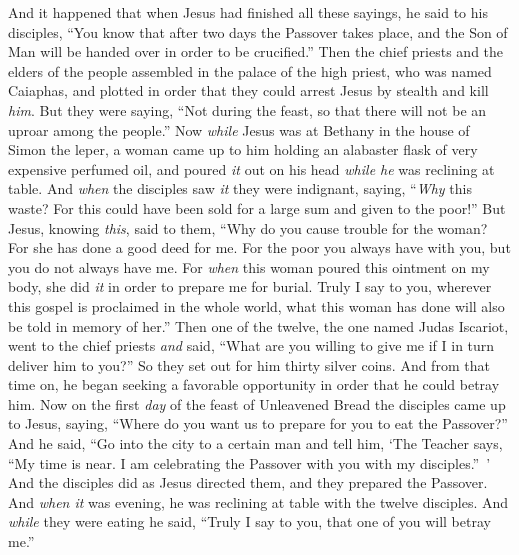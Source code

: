 \begin{biblechapter} %
 And it happened that when Jesus had finished all these sayings, he said to his disciples,
\verse “You know that after two days the Passover takes place, and the Son of Man will be handed over in order to be crucified.”
\verse Then the chief priests and the elders of the people assembled in the palace of the high priest, who was named Caiaphas,
\verse and plotted in order that they could arrest Jesus by stealth and kill \textit{him}.
\verse But they were saying, “Not during the feast, so that there will not be an uproar among the people.”
 Now \textit{while} Jesus was at Bethany in the house of Simon the leper,
\verse a woman came up to him holding an alabaster flask of very expensive perfumed oil, and poured \textit{it} out on his head \textit{while he} was reclining at table.
\verse And \textit{when} the disciples saw \textit{it} they were indignant, saying, “\textit{Why} this waste?
\verse For this could have been sold for a large sum and given to the poor!”
\verse But Jesus, knowing \textit{this}, said to them, “Why do you cause trouble for the woman? For she has done a good deed for me.
\verse For the poor you always have with you, but you do not always have me.
\verse For \textit{when} this woman poured this ointment on my body, she did \textit{it} in order to prepare me for burial.
\verse Truly I say to you, wherever this gospel is proclaimed in the whole world, what this woman has done will also be told in memory of her.”
 Then one of the twelve, the one named Judas Iscariot, went to the chief priests
\verse \textit{and} said, “What are you willing to give me if I in turn deliver him to you?” So they set out for him thirty silver coins.
\verse And from that time on, he began seeking a favorable opportunity in order that he could betray him.
 Now on the first \textit{day} of the feast of Unleavened Bread the disciples came up to Jesus, saying, “Where do you want us to prepare for you to eat the Passover?”
\verse And he said, “Go into the city to a certain man and tell him, ‘The Teacher says, “My time is near. I am celebrating the Passover with you with my disciples.” ’
\verse And the disciples did as Jesus directed them, and they prepared the Passover.
\verse And \textit{when it} was evening, he was reclining at table with the twelve disciples.
\verse And \textit{while} they were eating he said, “Truly I say to you, that one of you will betray me.”

\end{biblechapter}
